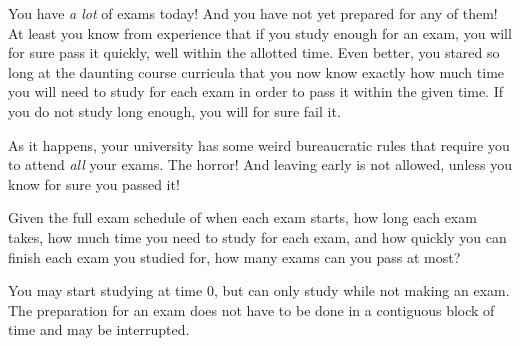 






You have \emph{a lot} of exams today! And you have not yet prepared for any of them!
At least you know from experience that if you study enough for an exam, you
will for sure pass it quickly, well within the allotted time. Even better, you stared so long
at the daunting course curricula that you now know exactly how much time you will
need to study for each exam in order to pass it within the given time. If
you do not study long enough, you will for sure fail it.

As it happens, your university has some weird bureaucratic rules that require you
to attend \emph{all} your exams. The horror! And leaving early is not allowed,
unless you know for sure you passed it!

Given the full exam schedule of when each exam starts, how long each exam
takes, how much time you need to study for each exam, and how quickly you can
finish each exam you studied for, how many exams can you pass at most?

You may start studying at time $0$, but can only study while not making an exam.
The preparation for an exam does not have to be done in a contiguous block of
time and may be interrupted.

